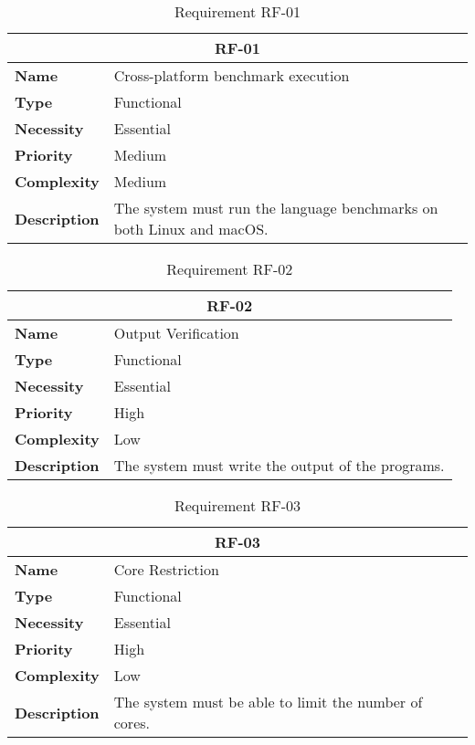 \begin{table}[H]
    \centering
    \begin{tabular}{l p{10cm}}
        \toprule
        \multicolumn{2}{c}{\textbf{RF-01}} \\
        \toprule
        \textbf{Name}               & Cross-platform benchmark execution \\
        \textbf{Type}               & Functional \\
        \textbf{Necessity}          & Essential \\
        \textbf{Priority}           & Medium \\
        \textbf{Complexity}         & Medium \\
        \textbf{Description}        & The system must run the language benchmarks on both Linux and macOS. \\
        \bottomrule
    \end{tabular}
\caption{Requirement RF-01}\label{tab:rf-01}
\end{table}

\begin{table}[H]
    \centering
    \begin{tabular}{l p{10cm}}
        \toprule
        \multicolumn{2}{c}{\textbf{RF-02}} \\
        \toprule
        \textbf{Name}               & Output Verification \\
        \textbf{Type}               & Functional \\
        \textbf{Necessity}          & Essential \\
        \textbf{Priority}           & High \\
        \textbf{Complexity}         & Low \\
        \textbf{Description}        & The system must write the output of the programs. \\
        \bottomrule
    \end{tabular}
\caption{Requirement RF-02}\label{tab:rf-02}
\end{table}

\begin{table}[H]
    \centering
    \begin{tabular}{l p{10cm}}
        \toprule
        \multicolumn{2}{c}{\textbf{RF-03}} \\
        \toprule
        \textbf{Name}               & Core Restriction \\
        \textbf{Type}               & Functional \\
        \textbf{Necessity}          & Essential \\
        \textbf{Priority}           & High \\
        \textbf{Complexity}         & Low \\
        \textbf{Description}        & The system must be able to limit the number of cores. \\
        \bottomrule
    \end{tabular}
\caption{Requirement RF-03}\label{tab:rf-03}
\end{table}

